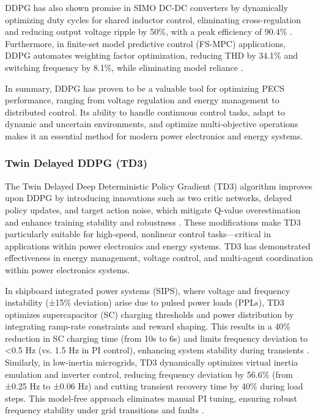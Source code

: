 DDPG has also shown promise in SIMO DC-DC converters by dynamically optimizing duty cycles for shared inductor control, eliminating cross-regulation and reducing output voltage ripple by 50\%, with a peak efficiency of 90.4\% \cite{ye2024deep}. Furthermore, in finite-set model predictive control (FS-MPC) applications, DDPG automates weighting factor optimization, reducing THD by 34.1\% and switching frequency by 8.1\%, while eliminating model reliance \cite{wan2024reinforcement}.

In summary, DDPG has proven to be a valuable tool for optimizing PECS performance, ranging from voltage regulation and energy management to distributed control. Its ability to handle continuous control tasks, adapt to dynamic and uncertain environments, and optimize multi-objective operations makes it an essential method for modern power electronics and energy systems.

\subsubsection{Twin Delayed DDPG (TD3)} 

The Twin Delayed Deep Deterministic Policy Gradient (TD3) algorithm improves upon DDPG by introducing innovations such as two critic networks, delayed policy updates, and target action noise, which mitigate Q-value overestimation and enhance training stability and robustness \cite{fujimoto2018addressing}. These modifications make TD3 particularly suitable for high-speed, nonlinear control tasks—critical in applications within power electronics and energy systems. TD3 has demonstrated effectiveness in energy management, voltage control, and multi-agent coordination within power electronics systems.

In shipboard integrated power systems (SIPS), where voltage and frequency instability (±15\% deviation) arise due to pulsed power loads (PPLs), TD3 optimizes supercapacitor (SC) charging thresholds and power distribution by integrating ramp-rate constraints and reward shaping. This results in a 40\% reduction in SC charging time (from 10s to 6s) and limits frequency deviation to <0.5 Hz (vs. 1.5 Hz in PI control), enhancing system stability during transients \cite{zhang2022optimal}. Similarly, in low-inertia microgrids, TD3 dynamically optimizes virtual inertia emulation and inverter control, reducing frequency deviation by 56.6\% (from ±0.25 Hz to ±0.06 Hz) and cutting transient recovery time by 40\% during load steps. This model-free approach eliminates manual PI tuning, ensuring robust frequency stability under grid transitions and faults \cite{egbomwan2022twin}.

